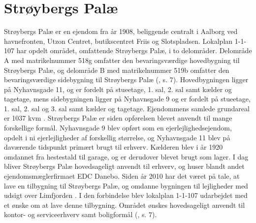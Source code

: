 \section{Strøybergs Palæ}
Strøybergs Palæ er en ejendom fra år 1908, beliggende centralt i Aalborg ved havnefronten, Utzon Centret, butikscentret Friis og Slotspladsen.
\newline \indent{     }  Lokalplan 1-1-107 har opdelt området, omfattende Strøybergs Palæ, i to delområder. Delområde A med matrikelnummer 518g omfatter den bevaringsværdige hovedbygning til Strøybergs Palæ, og delområde B med matrikelnummer 519b omfatter den bevaringsværdige sidebygning til Strøybergs Palæ (\citep{lokalplan}, s. 7). Hovedbygningen ligger på Nyhavnsgade 11, og er fordelt på stueetage, 1. sal, 2. sal samt kælder og tagetage, mens sidebygningen ligger på Nyhavnsgade 9 og er fordelt på stueetage, 1. sal, 2. sal og 3. sal samt kælder og tagetage. Ejendommens samlede grundareal er 1037 kvm \citep{byggesagen}.
\newline 
\newline 
Strøybergs Palæ er siden opførelsen blevet anvendt til mange forskellige formål. 
\newline \indent{     }  Nyhavnsgade 9 blev opført som en ejerlejlighedsejendom, opdelt i ni ejerlejligheder af forskellig størrelse, og Nyhavnsgade 11 blev på daværende tidspunkt primært brugt til erhverv. 
\newline \indent{     }  Kælderen blev i år 1920 omdannet fra hestestald til garage, og er derudover blevet brugt som lager.
\newline \indent{     }  I dag bliver Strøybergs Palæ hovedsageligt anvendt til erhverv, og huser blandt andet ejendomsmæglerfirmaet EDC Danebo.
\newline \indent{     }  Siden år 2010 har det været på tale, at lave en tilbygning til Strøybergs Palæ, og omdanne bygningen til lejligheder med udsigt over Limfjorden \citep{link}. I den forbindelse blev lokalplan 1-1-107 udarbejdet med et ønske om at lave denne tilbygning. Området ønskes hovedsageligt anvendt til kontor- og serviceerhverv samt boligformål (\citep{lokalplan}, s. 7).
